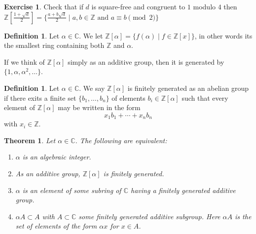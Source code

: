 \documentclass[11pt,a4paper]{report}
\theoremstyle{plain}
\newtheorem{theorem}[subsection]{Theorem}
\theoremstyle{definition}
\newtheorem{definition}[subsection]{Definition}
\theoremstyle{definition}
\newtheorem{question}[subsection]{Exercise}
\newcommand{\ZZ}{\mathbb{Z}}
\def\CC{\mathbb{C}}
\def \a{\alpha}
\begin{document}
	
	\begin{question}
		Check that if $d$ is square-free and congruent to $1$ modulo $4$ then $\ZZ[\frac{1+\sqrt{d}}{2}]=\{\frac{a+b\sqrt{d}}{2} \mid a,b \in \ZZ \text{ and } a \equiv b \pmod 2 \}$
	\end{question}
	
	\begin{definition}\label{definition: Z alpha}
		Let $\a \in \CC$. We let $\ZZ[\a]=\{f(\a) \mid f \in \ZZ[x]\}$, in other words its the smallest ring containing both $\ZZ$ and $\a$.
	\end{definition}
	
	If we think of $\ZZ[\a]$ simply as an additive group, then it is generated by $\{1,\a,\a^2,\dots\}$. 
	
	\begin{definition}
		Let $\a \in \CC$. We say $\ZZ[\a]$ is finitely generated as an abelian group if there exits a finite set $\{b_1,\dots,b_n\}$ of elements $b_i \in \ZZ[\a]$ such that every element of $\ZZ[\a]$ may be written in the form \[x_1b_1+\cdots+x_nb_n\] with $x_i \in \ZZ$.
	\end{definition}
	
	
	\begin{theorem}\label{thm: alg ints fin gen}
		Let $\a \in \CC$. The following are equivalent:
		
		\begin{enumerate}[(1)]
			\item[(1)] $\a$ is an algebraic integer.
			\item[(2)]  As an additive group, $\ZZ[\a]$ is finitely generated.
			\item[(3)] $\a$ is an element of some subring of $\CC$ having a finitely generated additive group.
			\item[(4)]  $\a A \subset A$  with  $A \subset \CC$ some finitely generated additive subgroup. Here $\a A$ is the set of elements of the form $\a x$ for $x \in A$.
		\end{enumerate}
		
		
	\end{theorem}
	
\end{document}

